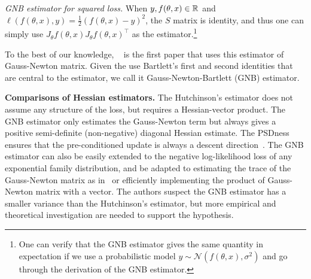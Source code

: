 \textit{GNB estimator for squared loss.} When $y, f(\theta,x)\in \mathbb{R}$ and $\ell(f(\theta, x), y)= \frac{1}{2}(f(\theta,x)-y)^2$, the $S$ matrix is identity, and thus one can simply use 
$J_\theta f(\theta, x) J_\theta f(\theta,x)^\top$ as the estimator.\footnote{One can verify that the GNB estimator gives the same quantity in expectation if we use a probabilistic model $y \sim \mathcal{N}(f(\theta, x), \sigma^2)$ and go through the derivation of the GNB estimator.}




To the best of our knowledge, ~\cite{wei2020implicit} is the first paper that uses this estimator of Gauss-Newton matrix. Given the use Bartlett's first and second identities that are central to the estimator, we call it Gauss-Newton-Bartlett (GNB) estimator. 



\textbf{Comparisons of Hessian estimators.}
The Hutchinson's estimator does not assume any structure of the loss, but requires a Hessian-vector product. The GNB estimator only estimates the Gauss-Newton term but always gives a positive semi-definite (non-negative) diagonal Hessian estimate. The PSDness ensures that the pre-conditioned update is always a descent direction~\citep{dennis1996numerical}. The GNB estimator can also be easily extended to the negative log-likelihood loss of any exponential family distribution, and be adapted to estimating the trace of the Gauss-Newton matrix as in~\citet{wei2020implicit} or efficiently implementing the product of Gauss-Newton matrix with a vector. The authors suspect the GNB estimator has a smaller variance than the Hutchinson's estimator, but more empirical and theoretical investigation are needed to support the hypothesis.  
